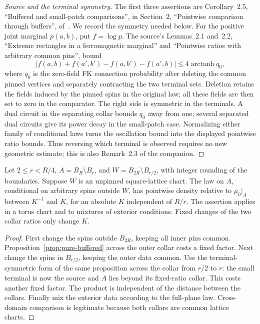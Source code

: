 \begin{proof}[Source and the terminal symmetry]
The first three assertions are Corollary~2.5, ``Buffered and small-patch
comparisons'', in Section~2, ``Pointwise comparison through buffers'',
of~\cite{OpenAIStatic2026}. We record the symmetry needed below. For the
positive joint marginal \(p(a,b)\), put \(f=\log p\). The source's
Lemmas~2.1 and~2.2, ``Extreme rectangles in a ferromagnetic marginal''
and ``Pointwise ratios with arbitrary common pins'', bound
\[
 \left|f(a,b)+f(a',b')-f(a,b')-f(a',b)\right|
 \le 4\operatorname{arctanh}q_0,
\]
where \(q_0\) is the zero-field FK connection probability after deleting
the common pinned vertices and separately contracting the two terminal
sets. Deletion retains the fields induced by the pinned spins in the
original law; all these fields are then set to zero in the comparator.
The right side is symmetric in the terminals. A dual circuit in
the separating collar bounds \(q_0\) away from one; several separated
dual circuits give its power decay in the small-patch case. Normalizing
either family of conditional laws turns the oscillation bound into the
displayed pointwise ratio bounds. Thus reversing which terminal is
observed requires no new geometric estimate; this is also
Remark~2.3 of the companion.
\end{proof}

\begin{corollary}
\label{cor:pure-annular}
Let \(2\le r<R/4\),
\(A=B_R\setminus B_r\), and \(W=B_{2R}\setminus B_{r/2}\), with
integer rounding of the boundaries. Suppose \(W\) is an unpinned
square-lattice chart. The law on \(A\), conditional on arbitrary spins
outside \(W\), has pointwise density relative to \(\mu_0|_A\) between
\(K^{-1}\) and \(K\), for an absolute \(K\) independent of \(R/r\).
The assertion applies in a torus chart and to mixtures of exterior
conditions. Fixed changes of the two collar ratios only change \(K\).
\end{corollary}

\begin{proof}
First change the spins outside \(B_{2R}\), keeping all inner pins
common. Proposition~\ref{prop:pure-buffered} across the outer collar
costs a fixed factor. Next change the spins in \(B_{r/2}\), keeping the
outer data common. Use the terminal-symmetric form of the same
proposition across the collar from \(r/2\) to \(r\): the small terminal
is now the source and \(A\) lies beyond its fixed-ratio collar. This
costs another fixed factor. The product is independent of the distance
between the collars. Finally mix the exterior data according to the
full-plane law. Cross-domain comparison is legitimate because both
collars are common lattice charts.
\end{proof}

